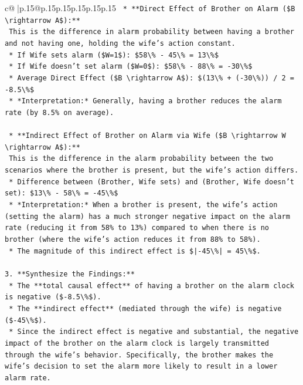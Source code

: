 \documentclass{article}
\begin{document}
{\begin{supertabular}{c@{$\;$}|p{.15\linewidth}@{}p{.15\linewidth}p{.15\linewidth}p{.15\linewidth}p{.15\linewidth}p{.15\linewidth}}
{{{\texttt{    *   **Direct Effect of Brother on Alarm (\$B \textbackslash{}rightarrow A\$):**} \\
\texttt{        This is the difference in alarm probability between having a brother and not having one, holding the wife's action constant.} \\
\texttt{        *   If Wife sets alarm (\$W=1\$): \$58\textbackslash{}\% {-} 45\textbackslash{}\% = 13\textbackslash{}\%\$} \\
\texttt{        *   If Wife doesn't set alarm (\$W=0\$): \$58\textbackslash{}\% {-} 88\textbackslash{}\% = {-}30\textbackslash{}\%\$} \\
\texttt{        *   Average Direct Effect (\$B \textbackslash{}rightarrow A\$): \$(13\textbackslash{}\% + ({-}30\textbackslash{}\%)) / 2 = {-}8.5\textbackslash{}\%\$} \\
\texttt{        *   *Interpretation:* Generally, having a brother reduces the alarm rate (by 8.5\% on average).} \\
\\ 
\texttt{    *   **Indirect Effect of Brother on Alarm via Wife (\$B \textbackslash{}rightarrow W \textbackslash{}rightarrow A\$):**} \\
\texttt{        This is the difference in the alarm probability between the two scenarios where the brother is present, but the wife's action differs.} \\
\texttt{        *   Difference between (Brother, Wife sets) and (Brother, Wife doesn't set): \$13\textbackslash{}\% {-} 58\textbackslash{}\% = {-}45\textbackslash{}\%\$} \\
\texttt{        *   *Interpretation:* When a brother is present, the wife's action (setting the alarm) has a much stronger negative impact on the alarm rate (reducing it from 58\% to 13\%) compared to when there is no brother (where the wife's action reduces it from 88\% to 58\%).} \\
\texttt{        *   The magnitude of this indirect effect is \$|{-}45\textbackslash{}\%| = 45\textbackslash{}\%\$.} \\
\\ 
\texttt{3.  **Synthesize the Findings:**} \\
\texttt{    *   The **total causal effect** of having a brother on the alarm clock is negative (\${-}8.5\textbackslash{}\%\$).} \\
\texttt{    *   The **indirect effect** (mediated through the wife) is negative (\${-}45\textbackslash{}\%\$).} \\
\texttt{    *   Since the indirect effect is negative and substantial, the negative impact of the brother on the alarm clock is largely transmitted through the wife's behavior. Specifically, the brother makes the wife's decision to set the alarm more likely to result in a lower alarm rate.} \\
}}}
\end{supertabular}}
\end{document}
